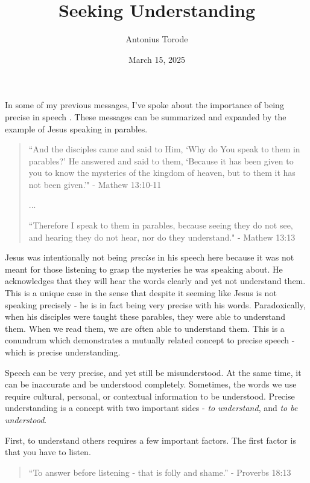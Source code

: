 \documentclass[10pt]{article}
\title{Seeking Understanding}
\author{Antonius Torode}
\date{March 15, 2025}
\begin{document}
\maketitle
\thispagestyle{fancy}

\begin{multicols}{2}

In some of my previous messages, I've spoke about the importance of being precise in speech \cite{Mean What You Say, Precision of Speech}. These messages can be summarized and expanded by the example of Jesus speaking in parables.

\begin{quotation}
``And the disciples came and said to Him, `Why do You speak to them in parables?' He answered and said to them, `Because it has been given to you to know the mysteries of the kingdom of heaven, but to them it has not been given.'" - Mathew 13:10-11

...

``Therefore I speak to them in parables, because seeing they do not see, and hearing they do not hear, nor do they understand." - Mathew 13:13
\end{quotation}
 
Jesus was intentionally not being \textit{precise} in his speech here because it was not meant for those listening to grasp the mysteries he was speaking about. He acknowledges that they will hear the words clearly and yet not understand them. This is a unique case in the sense that despite it seeming like Jesus is not speaking precisely - he is in fact being very precise with his words. Paradoxically, when his disciples were taught these parables, they were able to understand them. When we read them, we are often able to understand them. This is a conundrum which demonstrates a mutually related concept to precise speech - which is precise understanding. 

Speech can be very precise, and yet still be misunderstood. At the same time, it can be inaccurate and be understood completely. Sometimes, the words we use require cultural, personal, or contextual information to be understood. Precise understanding is a concept with two important sides - \textit{to understand}, and \textit{to be understood}.

First, to understand others requires a few important factors. The first factor is that you have to listen.

\begin{quotation}
``To answer before listening - that is folly and shame.'' - Proverbs 18:13
\end{quotation}


\end{multicols}
\end{document}
